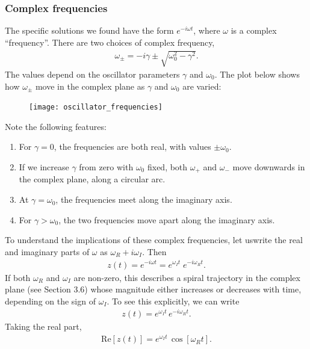 \documentclass[10pt,a4paper]{article}
\begin{document}
\subsubsection{Complex frequencies}
\label{complex-frequencies}

The specific solutions we found have the form $e^{-i\omega t}$, where
$\omega$ is a complex ``frequency''.  There are two choices of complex
frequency,
\begin{align}
  \omega_\pm = -i\gamma \pm \sqrt{\omega_0^2 - \gamma^2}.
  \label{eq:omegapm}
\end{align}
The values depend on the oscillator parameters $\gamma$ and
$\omega_0$.  The plot below shows how $\omega_\pm$ move in the complex
plane as $\gamma$ and $\omega_0$ are varied:

\begin{figure}[ht]
  \centering\texttt{[image: oscillator\_frequencies]}
\end{figure}

Note the following features:

\begin{enumerate}
\item For $\gamma = 0$, the frequencies are both real, with values
  $\pm \omega_0$.

\item If we increase $\gamma$ from zero with $\omega_0$ fixed, both
  $\omega_+$ and $\omega_-$ move downwards in the complex plane, along
  a circular arc.

\item At $\gamma = \omega_0$, the frequencies meet along the imaginary
  axis.

\item For $\gamma > \omega_0$, the two frequencies move apart along
  the imaginary axis.
\end{enumerate}

To understand the implications of these complex frequencies, let
uswrite the real and imaginary parts of $\omega$ as $\omega_R + i
\omega_I$.  Then
\begin{align}
  z(t) = e^{-i\omega t} = e^{\omega_I t} \; e^{-i\omega_R t}.
\end{align}
If both $\omega_R$ and $\omega_I$ are non-zero, this describes a
spiral trajectory in the complex plane (see Section 3.6) whose
magnitude either increases or decreases with time, depending on the
sign of $\omega_I$.  To see this explicitly, we can write
\begin{align}
  z(t) = e^{\omega_I t} \, e^{-i\omega_R t}.
\end{align}
Taking the real part,
\begin{align}
  \mathrm{Re}\left[z(t)\right] = e^{\omega_I t} \, \cos\left[\omega_R t\right].
  \label{eq:Rez}
\end{align}
\end{document}
